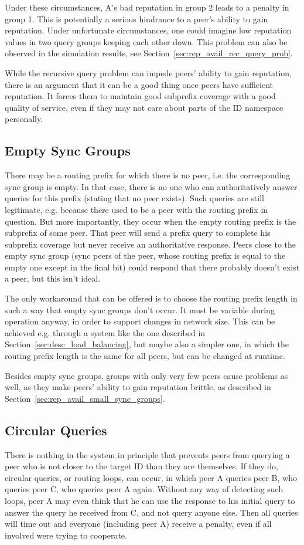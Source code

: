 Under these circumstances, A's bad reputation in group 2 leads to a penalty in
group 1. This is potentially a serious hindrance to a peer's ability to gain
reputation. Under unfortunate circumstances, one could imagine low reputation
values in two query groups keeping each other down. This problem can also be
observed in the simulation results, see
Section~\ref{sec:rep_avail_rec_query_prob}.

While the recursive query problem can impede peers' ability to gain reputation,
there is an argument that it can be a good thing once peers have sufficient
reputation. It forces them to maintain good subprefix coverage with a good
quality of service, even if they may not care about parts of the ID namespace
personally.

\subsection{Empty Sync Groups}
\label{sec:desc_empty_sync_groups}
There may be a routing prefix for which there is no peer, i.e. the corresponding
sync group is empty. In that case, there is no one who can authoritatively
answer queries for this prefix (stating that no peer exists). Such queries are
still legitimate, e.g. because there used to be a peer with the routing prefix
in question. But more importantly, they occur when the empty routing prefix is
the subprefix of some peer. That peer will send a prefix query to complete his
subprefix coverage but never receive an authoritative response. Peers close to
the empty sync group (sync peers of the peer, whose routing prefix is equal to
the empty one except in the final bit) could respond that there probably doesn't
exist a peer, but this isn't ideal.

The only workaround that can be offered is to choose the routing prefix length
in such a way that empty sync groups don't occur. It must be variable during
operation anyway, in order to support changes in network size. This can be
achieved e.g. through a system like the one described in
Section~\ref{sec:desc_load_balancing}, but maybe also a simpler one, in which
the routing prefix length is the same for all peers, but can be changed at
runtime.

Besides empty sync groups, groups with only very few peers cause problems as
well, as they make peers' ability to gain reputation brittle, as described in
Section~\ref{sec:rep_avail_small_sync_groups}.

\subsection{Circular Queries}
There is nothing in the system in principle that prevents peers from querying a
peer who is not closer to the target ID than they are themselves. If they do,
circular queries, or routing loops, can occur, in which peer A queries peer B,
who queries peer C, who queries peer A again. Without any way of detecting such
loops, peer A may even think that he can use the response to his initial query
to answer the query he received from C, and not query anyone else. Then all
queries will time out and everyone (including peer A) receive a penalty, even if
all involved were trying to cooperate.

